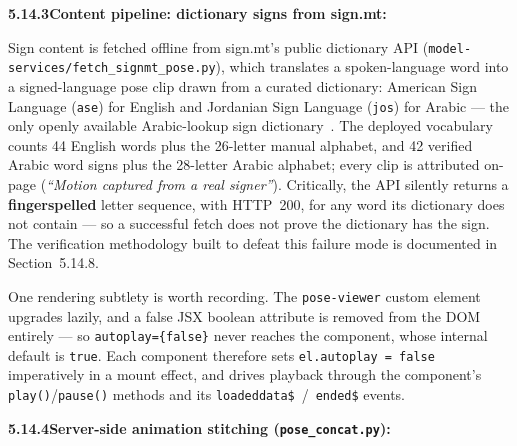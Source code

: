 \noindent\textbf{5.14.3\quad Content pipeline: dictionary signs from sign.mt:}\par
{}
\vspace{0.2cm}

\noindent Sign content is fetched offline from sign.mt's public dictionary API (\texttt{model-services/fetch\_signmt\_pose.py}), which translates a spoken-language word into a signed-language pose clip drawn from a curated dictionary: American Sign Language (\texttt{ase}) for English and Jordanian Sign Language (\texttt{jos}) for Arabic --- the only openly available Arabic-lookup sign dictionary~\cite{signmt2023}. The deployed vocabulary counts 44 English words plus the 26-letter manual alphabet, and 42 verified Arabic word signs plus the 28-letter Arabic alphabet; every clip is attributed on-page (\textit{``Motion captured from a real signer''}). Critically, the API silently returns a \textbf{fingerspelled} letter sequence, with HTTP~200, for any word its dictionary does not contain --- so a successful fetch does not prove the dictionary has the sign. The verification methodology built to defeat this failure mode is documented in Section~5.14.8.\par\vspace{0.2cm}

\noindent One rendering subtlety is worth recording. The \texttt{pose-viewer} custom element upgrades lazily, and a false JSX boolean attribute is removed from the DOM entirely --- so \texttt{autoplay=\{false\}} never reaches the component, whose internal default is \texttt{true}. Each component therefore sets \texttt{el.autoplay = false} imperatively in a mount effect, and drives playback through the component's \texttt{play()}/\texttt{pause()} methods and its \texttt{loadeddata\$}~/~\texttt{ended\$} events.\par\vspace{0.3cm}

\noindent\textbf{5.14.4\quad Server-side animation stitching (\texttt{pose\_concat.py}):}\par
{}
\vspace{0.2cm}

